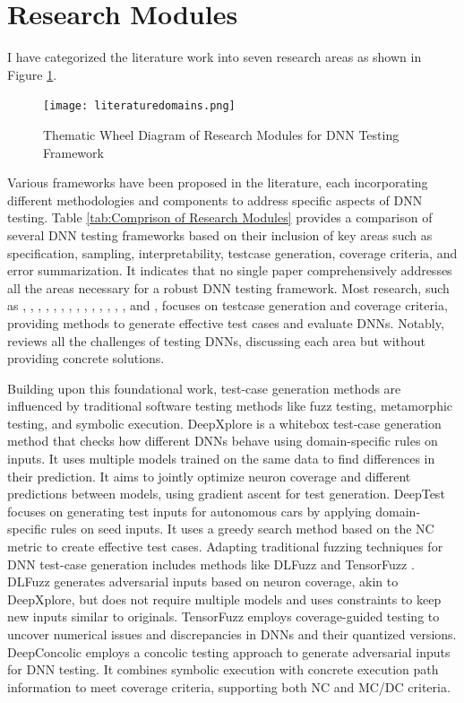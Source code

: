 \section{Research Modules}

I have categorized the literature work into seven research areas as shown in Figure \ref{fig:thematic_wheel}. 
\begin{figure}[h]
  \centering
  \texttt{[image: literaturedomains.png]}
  \caption{Thematic Wheel Diagram of Research Modules for DNN Testing Framework}
  \label{fig:thematic_wheel}
\end{figure}



 Various frameworks have been proposed in the literature, each incorporating different methodologies and components to address specific aspects of DNN testing. Table \ref{tab:Comprison of Research Modules} provides a comparison of several DNN testing frameworks based on their inclusion of key areas such as specification, sampling, interpretability, testcase generation, coverage criteria, and error summarization. It indicates that no single paper comprehensively addresses all the areas necessary for a robust DNN testing framework. Most research, such as \cite{deepxplore}, \cite{deeptest}, \cite{Wicker}, \cite{Ma}, \cite{SunY}, \cite{Sun}, \cite{Cheng}, \cite{Kim}, \cite{Concolic}, \cite{Deepconcolic}, \cite{tensorfuzz}, \cite{Deephunter}, \cite{DLFuzz}, \cite{Sayah}, and \cite{Dola}, focuses on testcase generation and coverage criteria, providing methods to generate effective test cases and evaluate DNNs. Notably, \cite{Braiek} reviews all the challenges of testing DNNs, discussing each area but without providing concrete solutions.

Building upon this foundational work, test-case generation methods are influenced by traditional software testing methods like fuzz testing, metamorphic testing, and symbolic execution. DeepXplore \cite{deepxplore} is a whitebox test-case generation method that checks how different DNNs behave using domain-specific rules on inputs. It uses multiple models trained on the same data to find differences in their prediction. It aims to jointly optimize neuron coverage and different predictions between models, using gradient ascent for test generation. DeepTest \cite{deeptest} focuses on generating test inputs for autonomous cars by applying domain-specific rules on seed inputs. It uses a greedy search method based on the NC metric to create effective test cases. Adapting traditional fuzzing techniques for DNN test-case generation includes methods like DLFuzz \cite{DLFuzz} and TensorFuzz \cite{tensorfuzz}. DLFuzz generates adversarial inputs based on neuron coverage, akin to DeepXplore, but does not require multiple models and uses constraints to keep new inputs similar to originals. TensorFuzz employs coverage-guided testing to uncover numerical issues and discrepancies in DNNs and their quantized versions. DeepConcolic \cite{Deepconcolic} employs a concolic testing approach to generate adversarial inputs for DNN testing. It combines symbolic execution with concrete execution path information to meet coverage criteria, supporting both NC and MC/DC criteria.

